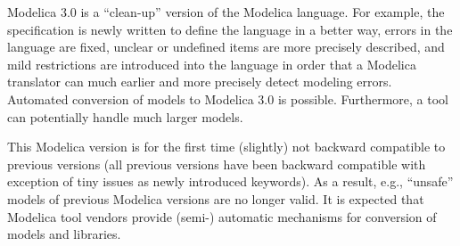 Modelica 3.0 is a ``clean-up'' version of the Modelica language. For
example, the specification is newly written to define the language in a
better way, errors in the language are fixed, unclear or undefined items
are more precisely described, and mild restrictions are introduced into
the language in order that a Modelica translator can much earlier and
more precisely detect modeling errors. Automated conversion of models to
Modelica 3.0 is possible. Furthermore, a tool can potentially handle
much larger models.

This Modelica version is for the first time (slightly) not backward
compatible to previous versions (all previous versions have been
backward compatible with exception of tiny issues as newly introduced
keywords). As a result, e.g., ``unsafe'' models of previous Modelica
versions are no longer valid. It is expected that Modelica tool vendors
provide (semi-) automatic mechanisms for conversion of models and
libraries.

